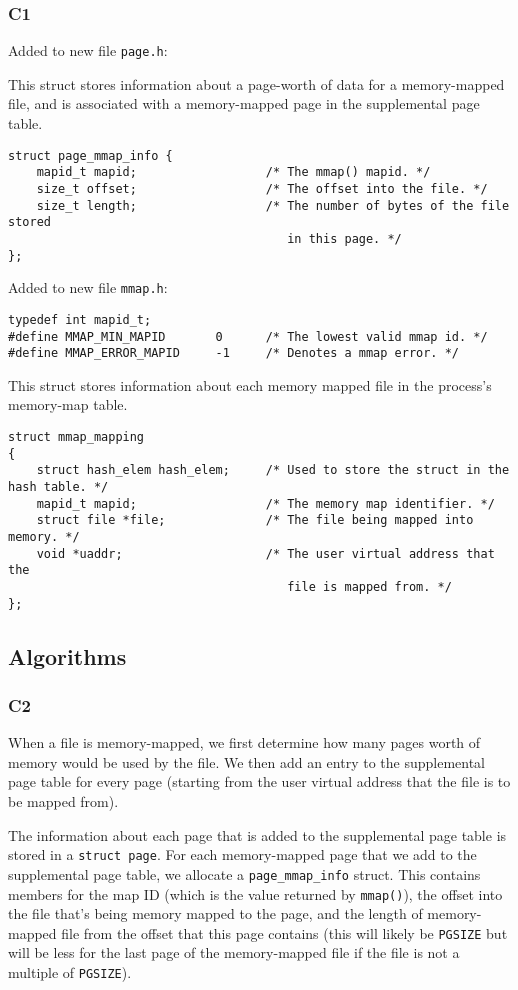 \documentclass[a4wide, 11pt]{article}
\newcommand{\tx}{\texttt}
\begin{document}
\subsubsection{C1}
Added to new file \tx{page.h}:

This struct stores information about a page-worth of data for a memory-mapped file, and is associated with a memory-mapped page in the supplemental page table.
\begin{verbatim}
struct page_mmap_info {
    mapid_t mapid;                  /* The mmap() mapid. */
    size_t offset;                  /* The offset into the file. */
    size_t length;                  /* The number of bytes of the file stored
                                       in this page. */
};
\end{verbatim}

Added to new file \tx{mmap.h}:
\begin{verbatim}
typedef int mapid_t;
#define MMAP_MIN_MAPID       0      /* The lowest valid mmap id. */
#define MMAP_ERROR_MAPID     -1     /* Denotes a mmap error. */
\end{verbatim}

This struct stores information about each memory mapped file in the process's memory-map table.
\begin{verbatim}
struct mmap_mapping
{
    struct hash_elem hash_elem;     /* Used to store the struct in the hash table. */
    mapid_t mapid;                  /* The memory map identifier. */
    struct file *file;              /* The file being mapped into memory. */
    void *uaddr;                    /* The user virtual address that the
                                       file is mapped from. */
};
\end{verbatim}

\subsection{Algorithms}
\subsubsection{C2}

When a file is memory-mapped, we first determine how many pages worth of memory would be used by the file. We then add an entry to the supplemental page table for every page (starting from the user virtual address that the file is to be mapped from).

The information about each page that is added to the supplemental page table is stored in a \tx{struct page}. For each memory-mapped page that we add to the supplemental page table, we allocate a \tx{page\_mmap\_info} struct. This contains members for the map ID (which is the value returned by \tx{mmap()}), the offset into the file that's being memory mapped to the page, and the length of memory-mapped file from the offset that this page contains (this will likely be \tx{PGSIZE} but will be less for the last page of the memory-mapped file if the file is not a multiple of \tx{PGSIZE}).
\end{document}
